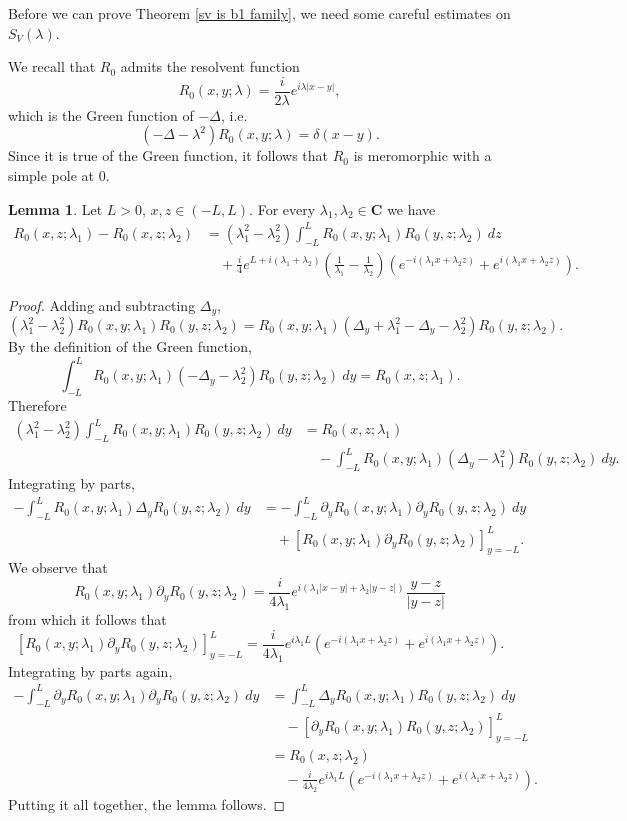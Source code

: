 \documentclass[12pt]{report}
\newcommand{\CC}{\mathbf{C}}
\theoremstyle{definition}
\newtheorem{lemma}[theorem]{Lemma}
\begin{document}
Before we can prove Theorem \ref{sv is b1 family}, we need some careful estimates on $S_V(\lambda)$.

We recall that $R_0$ admits the resolvent function
$$R_0(x, y; \lambda) = \frac{i}{2\lambda}e^{i\lambda|x-y|},$$
which is the Green function of $-\Delta$, i.e.
$$(-\Delta - \lambda^2)R_0(x, y; \lambda) = \delta(x - y).$$
Since it is true of the Green function, it follows that $R_0$ is meromorphic with a simple pole at $0$.
\begin{lemma}
Let $L > 0$, $x,z \in (-L, L)$. For every $\lambda_1,\lambda_2 \in \CC$ we have
\begin{align*}R_0(x, z; \lambda_1) - R_0(x, z; \lambda_2)
    &= (\lambda_1^2 - \lambda_2^2)\int_{-L}^L R_0(x, y; \lambda_1)R_0(y, z; \lambda_2) ~dz\\
    &\quad+\frac{i}{4}e^{L + i(\lambda_1 + \lambda_2)}\left(\frac{1}{\lambda_1} - \frac{1}{\lambda_2}\right)(e^{-i(\lambda_1x + \lambda_2z)} + e^{i(\lambda_1x + \lambda_2z)}).
\end{align*}
\end{lemma}
\begin{proof}
Adding and subtracting $\Delta_y$,
$$(\lambda_1^2 - \lambda_2^2)R_0(x, y; \lambda_1)R_0(y, z; \lambda_2) = R_0(x, y; \lambda_1)(\Delta_y + \lambda_1^2 - \Delta_y - \lambda_2^2)R_0(y, z; \lambda_2).$$
By the definition of the Green function,
$$\int_{-L}^L R_0(x, y; \lambda_1)(-\Delta_y - \lambda_2^2)R_0(y, z; \lambda_2) ~dy = R_0(x, z; \lambda_1).$$
Therefore
\begin{align*}
  (\lambda_1^2 - \lambda_2^2)\int_{-L}^L R_0(x, y; \lambda_1)R_0(y, z; \lambda_2) ~dy &= R_0(x, z; \lambda_1)\\
  &\quad-\int_{-L}^L R_0(x, y;\lambda_1)(\Delta_y - \lambda_1^2)R_0(y, z; \lambda_2) ~dy.
\end{align*}
Integrating by parts,
\begin{align*}
  -\int_{-L}^L R_0(x, y; \lambda_1)\Delta_y R_0(y, z; \lambda_2) ~dy &= -\int_{-L}^L \partial_yR_0(x, y; \lambda_1)\partial_y R_0(y, z; \lambda_2) ~dy\\
    &\quad+ [R_0(x, y; \lambda_1)\partial_y R_0(y, z; \lambda_2)]_{y=-L}^L.
\end{align*}
We observe that
$$R_0(x, y; \lambda_1)\partial_y R_0(y, z; \lambda_2) = \frac{i}{4\lambda_1}e^{i(\lambda_1|x-y|+\lambda_2|y-z|)}\frac{y-z}{|y-z|}$$
from which it follows that
$$[R_0(x, y; \lambda_1)\partial_y R_0(y, z; \lambda_2)]_{y=-L}^L = \frac{i}{4\lambda_1} e^{i\lambda_1L}(e^{-i(\lambda_1x + \lambda_2z)} + e^{i(\lambda_1x + \lambda_2z)}).$$
Integrating by parts again,
\begin{align*}
  -\int_{-L}^L \partial_yR_0(x, y; \lambda_1)\partial_y R_0(y, z; \lambda_2) ~dy &= \int_{-L}^L \Delta_yR_0(x, y; \lambda_1)R_0(y, z; \lambda_2) ~dy\\
  &\quad- [\partial_yR_0(x, y; \lambda_1) R_0(y, z; \lambda_2)]_{y=-L}^L\\
  &= R_0(x, z; \lambda_2) \\
  &\quad- \frac{i}{4\lambda_2} e^{i\lambda_1L}(e^{-i(\lambda_1x + \lambda_2z)} + e^{i(\lambda_1x + \lambda_2z)}).
\end{align*}
Putting it all together, the lemma follows.
\end{proof}
\end{document}

